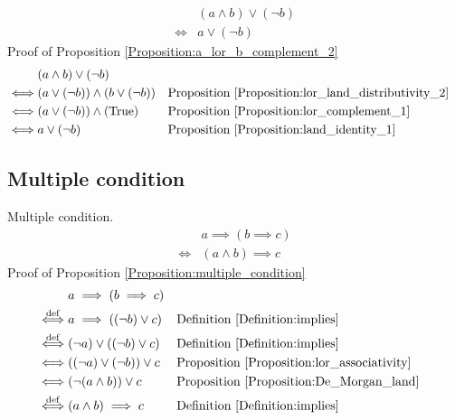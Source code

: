 \begin{prop}
\label{Proposition:a_lor_b_complement_2}
\begin{align*}
& (a \land b) \lor (\lnot b) \\
\iff & a \lor (\lnot b)
\end{align*}
Proof of Proposition \ref{Proposition:a_lor_b_complement_2}
\begin{align*}
& (a \land b) \lor (\lnot b) \\
\iff & (a \lor (\lnot b)) \land (b \lor (\lnot b))
& & \text{Proposition \ref{Proposition:lor_land_distributivity_2}} \\
\iff & (a \lor (\lnot b)) \land (\text{True})
& & \text{Proposition \ref{Proposition:lor_complement_1}} \\
\iff & a \lor (\lnot b)
& & \text{Proposition \ref{Proposition:land_identity_1}} \\
\end{align*}
\end{prop}

\subsection{Multiple condition}
\begin{prop}
\label{Proposition:multiple_condition}
Multiple condition.
\begin{align*}
& a \implies (b \implies c) \\
\iff & (a \land b) \implies c
\end{align*}
Proof of Proposition \ref{Proposition:multiple_condition}
\begin{align*}
& a \implies (b \implies c) \\
\overset{\operatorname{def}}{\iff} & a \implies ((\lnot b) \lor c)
& & \text{Definition \ref{Definition:implies}} \\
\overset{\operatorname{def}}{\iff} & (\lnot a) \lor ((\lnot b) \lor c)
& & \text{Definition \ref{Definition:implies}} \\
\iff & ((\lnot a) \lor (\lnot b)) \lor c
& & \text{Proposition \ref{Proposition:lor_associativity}} \\
\iff & (\lnot (a \land b)) \lor c
& & \text{Proposition \ref{Proposition:De_Morgan_land}} \\
\overset{\operatorname{def}}{\iff} & (a \land b) \implies c
& & \text{Definition \ref{Definition:implies}} \\
\end{align*}
\end{prop}

